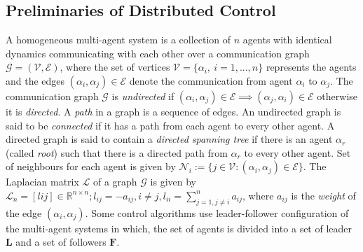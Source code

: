 \documentclass[letterpaper, 10 pt, conference]{ieeeconf}
\begin{document}
\subsection{Preliminaries of Distributed Control}
A homogeneous multi-agent system is a collection of $n$ agents with identical dynamics communicating with each other over a communication graph $\mathcal{G}=(\mathcal{V}, \mathcal{E})$, where the set of vertices $\mathcal{V}=\{\alpha_i,~i=1,...,n\}$ represents the agents and the edges $(\alpha_i,\alpha_j)\in\mathcal{E}$ denote the communication from agent $\alpha_i$ to $\alpha_j$. The communication graph $\mathcal{G}$ is \textit{undirected} if $(\alpha_i,\alpha_j)\in\mathcal{E}\implies(\alpha_j,\alpha_i)\in\mathcal{E}$
otherwise it is \textit{directed}. A \textit{path} in a graph is a sequence of edges. An undirected graph is said to be \textit{connected} if it has a path from each agent to every other agent. A directed graph is said to contain a \textit{directed spanning tree} if there is an agent $\alpha_r$ (called \textit{root}) such that there is a directed path from $\alpha_r$ to every other agent. Set of neighbours for each agent is given by $\mathcal{N}_{i} := \{j \in \mathcal{V} : (\alpha_i,\alpha_j) \in \mathcal{E} \}$. The Laplacian matrix $\mathcal{L}$ of a graph $\mathcal{G}$ is given by $\mathcal{L}_{n}=\left[l{i j}\right] \in \mathbb{R}^{n \times n} ; l_{i j}=-a_{i j}, i \neq j, l_{i i}=\sum_{j=1, j \neq i}^{n} a_{i j} $, where $a_{ij}$ is the \textit{weight} of the edge $(\alpha_i, \alpha_j)$.
Some control algorithms use leader-follower configuration of the multi-agent systems in which, the set of agents is divided into a set of leader $\mathbf{L}$ and a set of followers $\mathbf{F}$.
\end{document}
